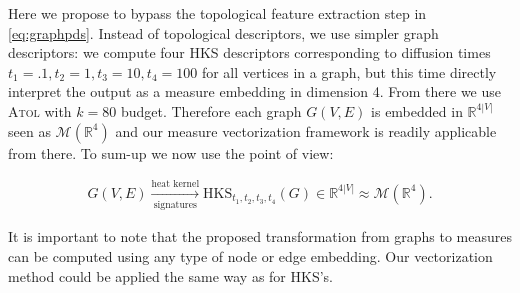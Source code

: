 \documentclass[noinfoline,preprint]{article}
\renewcommand{\1}{\mathds 1}
\begin{document}
Here we propose to bypass the topological feature extraction step in \eqref{eq:graphpds}. Instead of topological descriptors, we use simpler graph descriptors: we compute four HKS descriptors corresponding to diffusion times $t_1=.1, t_2=1, t_3=10, t_4=100$ for all vertices in a graph, but this time directly interpret the output as a measure embedding in dimension 4. From there we use \textsc{Atol} with $k=80$ budget. Therefore each graph $G(V, E)$ is embedded in $\mathbb{R}^{4|V|}$ seen as $\mathcal{M}(\mathbb{R}^4)$ and our measure vectorization framework is readily applicable from there. To sum-up we now use the point of view:

\begin{align}
G(V, E) \xrightarrow[\text{signatures}]{\text{heat kernel}} \text{HKS}_{t_1, t_2, t_3, t_4}(G) \in \mathbb{R}^{4|V|} \approx \mathcal{M}(\mathbb{R}^4).
\label{eq:graphdirect}
\end{align}

It is important to note that the proposed transformation from graphs to measures can be computed using any type of node or edge embedding. Our vectorization method could be applied the same way as for HKS's. 
\end{document}
